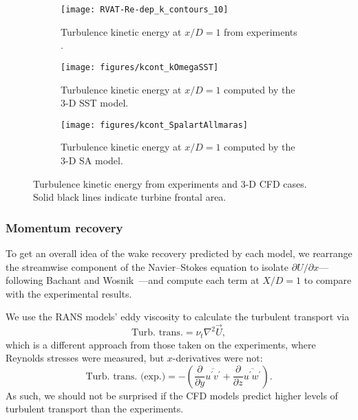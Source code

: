 \begin{figure}
    \centering
    \begin{subfigure}[b]{\textwidth}
        \centering

        \texttt{[image: RVAT-Re-dep\_k\_contours\_10]}

        \caption{Turbulence kinetic energy at $x/D=1$ from experiments
            \cite{Bachant2016-RVAT-Re-dep}.}

        \label{fig:kcont-exp}
    \end{subfigure}

    \begin{subfigure}[b]{\textwidth}
        \centering

        \texttt{[image: figures/kcont\_kOmegaSST]}

        \caption{Turbulence kinetic energy at $x/D=1$ computed by the 3-D SST
            model.}

        \label{fig:kcont-SST}
    \end{subfigure}

    \begin{subfigure}[b]{\textwidth}
        \centering

        \texttt{[image: figures/kcont\_SpalartAllmaras]}

        \caption{Turbulence kinetic energy at $x/D=1$ computed by the 3-D SA
            model.}

        \label{fig:kcont-SA}
    \end{subfigure}

    \caption{Turbulence kinetic energy from experiments and 3-D CFD cases. Solid
        black lines indicate turbine frontal area.}

    \label{fig:br-cfd-kcont}
\end{figure}


\subsubsection{Momentum recovery}

To get an overall idea of the wake recovery predicted by each model, we
rearrange the streamwise component of the Navier--Stokes equation to isolate
$\partial U / \partial x$---following Bachant and
Wosnik~\cite{Bachant2015-JoT}---and compute each term at $X/D = 1$ to compare
with the experimental results.

We use the RANS models' eddy viscosity to calculate the turbulent transport via
\begin{equation}
    \text{Turb. trans.} = \nu_t \nabla^2 \vec{U},
    \label{eq:turb-trans}
\end{equation}
which is a different approach from those taken on the experiments, where
Reynolds stresses were measured, but $x$-derivatives were not:
\begin{equation}
    \text{Turb. trans. (exp.)} =
    -\left(
    \frac{\partial}{\partial y} \overline{u^\prime v^\prime}
    +
    \frac{\partial}{\partial z} \overline{u^\prime w^\prime}
    \right).
\end{equation}
As such, we should not be surprised if the CFD models predict higher levels of
turbulent transport than the experiments.

